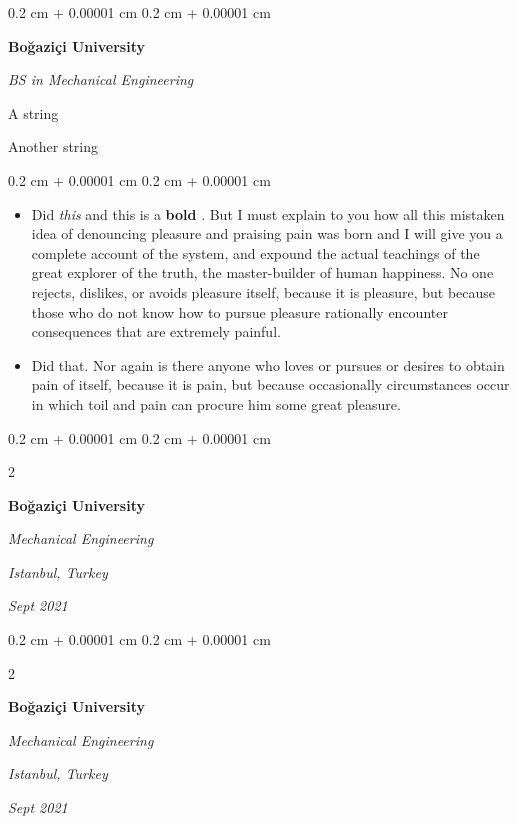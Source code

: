 \documentclass[10pt, letterpaper]{article}
\newenvironment{summary}{
    \begin{description}[
        topsep=0.10 cm,
        parsep=0.10 cm,
        partopsep=0pt,
        itemsep=0pt,
        leftmargin=0.4 cm + 10pt
    ]
}{
    \end{description}
} %
\newenvironment{highlights}{
    \begin{itemize}[
        topsep=0.10 cm,
        parsep=0.10 cm,
        partopsep=0pt,
        itemsep=0pt,
        leftmargin=0.4 cm + 10pt
    ]
}{
    \end{itemize}
} %
\newenvironment{onecolentry}{
    \begin{adjustwidth}{
        0.2 cm + 0.00001 cm
    }{
        0.2 cm + 0.00001 cm
    }
}{
    \end{adjustwidth}
} %
\newenvironment{twocolentry}[2][]{
    \onecolentry
    \def\secondColumn{#2}
    \setcolumnwidth{\fill, 4.5 cm}
    \begin{paracol}{2}
}{
    \switchcolumn \raggedleft \secondColumn
    \end{paracol}
    \endonecolentry
} %
\let\hrefWithoutArrow\href
\renewcommand{\href}[2]{\hrefWithoutArrow{#1}{\ifthenelse{\equal{#2}{}}{ }{#2 }\raisebox{.15ex}{\footnotesize \faExternalLink*}}}
\begin{document}
        \begin{onecolentry}
            \textbf{Boğaziçi University}

            \textit{BS in Mechanical Engineering}
        \end{onecolentry}
            \begin{summary}
                \item A string
                \item Another string
            \end{summary}
        \vspace{0.10 cm}
        \begin{onecolentry}
            \begin{highlights}
                \item Did \textit{this} and this is a \textbf{bold} \href{https://example.com}{link}. But I must explain to you how all this mistaken idea of denouncing pleasure and praising pain was born and I will give you a complete account of the system, and expound the actual teachings of the great explorer of the truth, the master-builder of human happiness. No one rejects, dislikes, or avoids pleasure itself, because it is pleasure, but because those who do not know how to pursue pleasure rationally encounter consequences that are extremely painful.
                \item Did that. Nor again is there anyone who loves or pursues or desires to obtain pain of itself, because it is pain, but because occasionally circumstances occur in which toil and pain can procure him some great pleasure.
            \end{highlights}
        \end{onecolentry}


        \vspace{0.2 cm}

        \begin{twocolentry}{
        \textit{Istanbul, Turkey}    
            
        \textit{Sept 2021}}
            \textbf{Boğaziçi University}

            \textit{Mechanical Engineering}
        \end{twocolentry}


        \vspace{0.2 cm}

        \begin{twocolentry}{
        \textit{Istanbul, Turkey}    
            
        \textit{Sept 2021}}
            \textbf{Boğaziçi University}

            \textit{Mechanical Engineering}
        \end{twocolentry}
\end{document}
